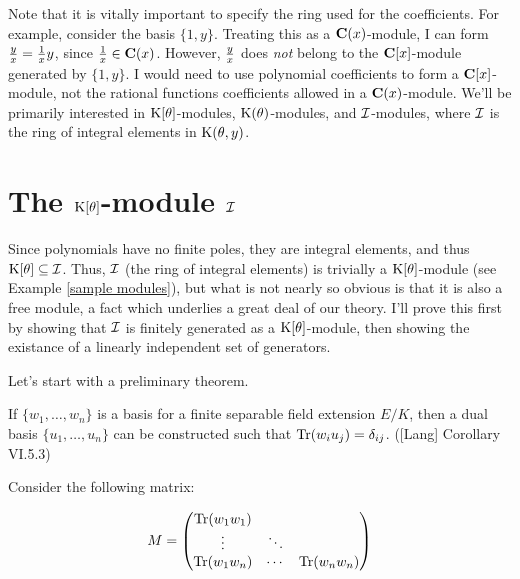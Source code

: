 %

\endexample


Note that it is vitally important to specify the ring used for the
coefficients.  For example, consider the basis $\{1, y\}$.  Treating
this as a ${\bf C}(x)$-module, I can form ${y \over x} = {1 \over x}
y$, since ${1 \over x} \in {\bf C}(x)$.  However, $y \over x$ does
{\it not} belong to the ${\bf C}[x]$-module generated by $\{1, y\}$.
I would need to use polynomial coefficients to form a ${\bf
C}[x]$-module, not the rational functions coefficients allowed in a
${\bf C}(x)$-module.  We'll be primarily interested in ${\rm
K}[\theta]$-modules, ${\rm K}(\theta)$-modules, and ${\cal
I}$-modules, where ${\cal I}$ is the ring of integral elements in
${\rm K}(\theta,y)$.


% 

\section{The ${\rm K}[\theta]$-module ${\cal I}$}

Since polynomials have no finite poles, they are integral elements,
and thus ${\rm K}[\theta] \subseteq {\cal I}$.  Thus, ${\cal I}$ (the
ring of integral elements) is trivially a ${\rm K}[\theta]$-module
(see Example \ref{sample modules}), but what is not nearly so obvious
is that it is also a free module, a fact which underlies a great deal
of our theory.  I'll prove this first by showing that ${\cal I}$ is
finitely generated as a ${\rm K}[\theta]$-module, then showing the
existance of a linearly independent set of generators.

Let's start with a preliminary theorem.

\theorem
\label{construction of dual basis}

If $\{w_1,\ldots,w_n\}$ is a basis for a finite separable field
extension $E/K$, then a dual basis $\{u_1,\ldots,u_n\}$ can be
constructed such that ${\rm Tr}(w_i u_j) = \delta_{ij}$.
([Lang] Corollary VI.5.3)

\proof

Consider the following matrix:

$$M = \begin{pmatrix}{\rm Tr}(w_1 w_1) & & \cr \vdots & \ddots & \cr {\rm Tr}(w_1 w_n) & \cdots & {\rm Tr}(w_n w_n)\end{pmatrix}$$

